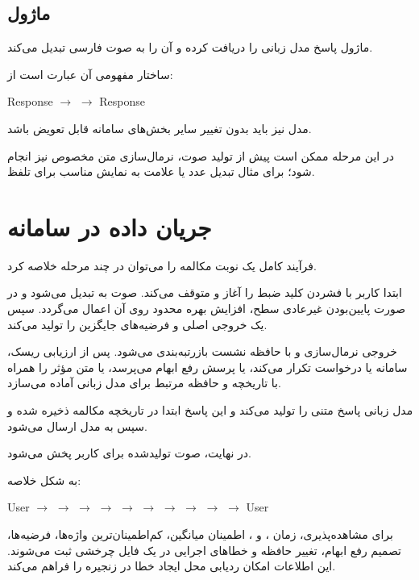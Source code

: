 \subsection{ماژول }

ماژول  پاسخ مدل زبانی را دریافت کرده و آن را به صوت فارسی
تبدیل می‌کند.

ساختار مفهومی آن عبارت است از:

\begin{center}
Response 
$\longrightarrow$
 
$\longrightarrow$
 Response
\end{center}

مدل  نیز باید بدون تغییر سایر بخش‌های سامانه قابل تعویض باشد.

در این مرحله ممکن است پیش از تولید صوت، نرمال‌سازی متن
مخصوص  نیز انجام شود؛ برای مثال تبدیل عدد یا علامت به
نمایش مناسب برای تلفظ.


\section{جریان داده در سامانه}

فرآیند کامل یک نوبت مکالمه را می‌توان در چند مرحله خلاصه کرد.

ابتدا کاربر با فشردن کلید ضبط را آغاز و متوقف می‌کند. صوت به
 تبدیل می‌شود و در صورت پایین‌بودن غیرعادی سطح، افزایش
بهره محدود روی آن اعمال می‌گردد. سپس  یک خروجی اصلی و
فرضیه‌های جایگزین را تولید می‌کند.

خروجی  نرمال‌سازی و با حافظه نشست بازرتبه‌بندی می‌شود.
پس از ارزیابی ریسک، سامانه یا درخواست تکرار می‌کند، یا پرسش رفع
ابهام می‌پرسد، یا متن مؤثر را همراه با تاریخچه و حافظه مرتبط برای
مدل زبانی آماده می‌سازد.

مدل زبانی پاسخ متنی را تولید می‌کند و این پاسخ ابتدا در
تاریخچه مکالمه ذخیره شده و سپس به مدل  ارسال می‌شود.

در نهایت، صوت تولیدشده برای کاربر پخش می‌شود.

به شکل خلاصه:

\begin{center}
User
$\rightarrow$
$\rightarrow$
$\rightarrow$
$\rightarrow$
$\rightarrow$
$\rightarrow$
$\rightarrow$
$\rightarrow$
$\rightarrow$
$\rightarrow$
User
\end{center}

برای مشاهده‌پذیری، زمان ،  و ، اطمینان
میانگین، کم‌اطمینان‌ترین واژه‌ها، فرضیه‌ها، تصمیم رفع ابهام،
تغییر حافظه و خطاهای اجرایی در یک فایل  چرخشی ثبت
می‌شوند. این اطلاعات امکان ردیابی محل ایجاد خطا در زنجیره را
فراهم می‌کند.
